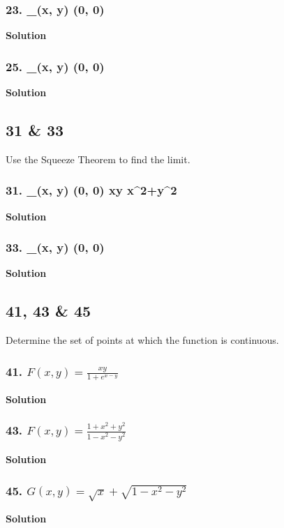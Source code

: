\documentclass{article}
\newcommand{\limit}[4]{\lim_{(#1, #2) \to (#3, #4)}}
\begin{document}
\subsubsection*{23. \limit x y 0 0 \displaystyle{}}
\centerline{\textbf{Solution}}
\subsubsection*{25. \limit x y 0 0 \displaystyle{}}
\centerline{\textbf{Solution}}
\subsection*{31 \& 33}
Use the Squeeze Theorem to find the limit.
\subsubsection*{31. \limit x y 0 0 xy\sin \displaystyle{} {x^2+y^2}}
\centerline{\textbf{Solution}}
\subsubsection*{33. \limit x y 0 0 \displaystyle{}}
\centerline{\textbf{Solution}}
\subsection*{41, 43 \& 45}
Determine the set of points at which the function is continuous.
\subsubsection*{41. $F(x,y) = \displaystyle\frac{xy}{1+e^{x-y}}$}
\centerline{\textbf{Solution}}
\subsubsection*{43. $F(x,y) = \displaystyle\frac{1+x^2+y^2}{1-x^2-y^2}$}
\centerline{\textbf{Solution}}
\subsubsection*{45. $G(x,y) = \sqrt x + \sqrt{1 - x^2 - y^2}$}
\centerline{\textbf{Solution}}
\end{document}
